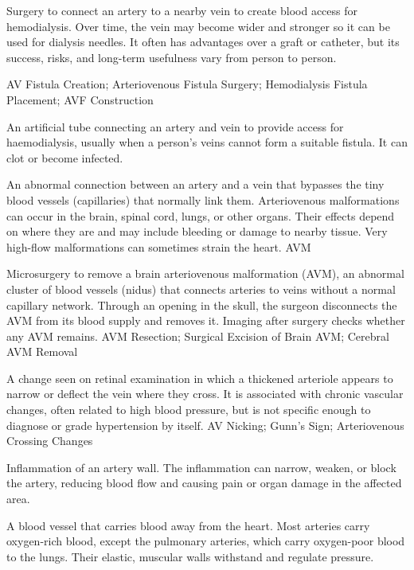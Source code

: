  Surgery to connect an artery to a nearby vein to create blood access for hemodialysis. Over time, the vein may become wider and stronger so it can be used for dialysis needles. It often has advantages over a graft or catheter, but its success, risks, and long-term usefulness vary from person to person.

\synonyms
AV Fistula Creation; Arteriovenous Fistula Surgery; Hemodialysis Fistula Placement; AVF Construction

 An artificial tube connecting an artery and vein to provide access for haemodialysis, usually when a person’s veins cannot form a suitable fistula. It can clot or become infected.

 An abnormal connection between an artery and a vein that bypasses the tiny blood vessels (capillaries) that normally link them. Arteriovenous malformations can occur in the brain, spinal cord, lungs, or other organs. Their effects depend on where they are and may include bleeding or damage to nearby tissue. Very high-flow malformations can sometimes strain the heart.
\synonyms
AVM

 Microsurgery to remove a brain arteriovenous
malformation (AVM), an abnormal cluster of blood vessels (nidus) that connects arteries to veins
without a normal capillary network. Through an opening in the skull, the surgeon disconnects the
AVM from its blood supply and removes it. Imaging after surgery checks whether any AVM remains.
\synonyms
AVM Resection; Surgical Excision of Brain AVM; Cerebral AVM Removal

 A change seen on retinal examination in which a thickened arteriole appears to narrow or deflect the vein where they cross. It is associated with chronic vascular changes, often related to high blood pressure, but is not specific enough to diagnose or grade hypertension by itself.
\synonyms
AV Nicking; Gunn's Sign; Arteriovenous Crossing Changes

 Inflammation of an artery wall. The inflammation can narrow, weaken, or block the artery, reducing blood flow and causing pain or organ damage in the affected area.

 A blood vessel that carries blood away from the heart. Most arteries carry oxygen-rich blood, except the pulmonary arteries, which carry oxygen-poor blood to the lungs. Their elastic, muscular walls withstand and regulate pressure.

